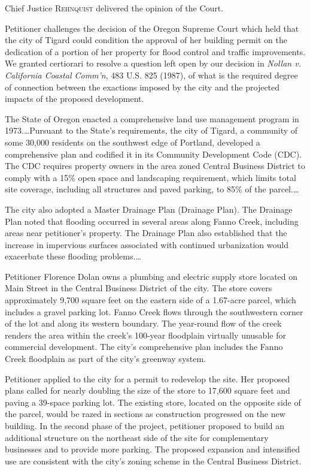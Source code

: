 

\opinion Chief Justice \textsc{Rehnquist} delivered the opinion of the Court.

Petitioner challenges the decision of the Oregon Supreme Court which held that
the city of Tigard could condition the approval of her building permit on the
dedication of a portion of her property for flood control and traffic
improvements. We granted certiorari to resolve a question left open by our
decision in \textit{Nollan v. California Coastal Comm'n}, 483 U.S. 825 (1987),
of what is the required degree of connection between the exactions imposed by
the city and the projected impacts of the proposed development.



The State of Oregon enacted a comprehensive land use management program in
1973.\ldots Pursuant to the State's requirements, the city of Tigard, a
community of some 30,000 residents on the southwest edge of Portland, developed
a comprehensive plan and codified it in its Community Development Code (CDC).
The CDC requires property owners in the area zoned Central Business District to
comply with a 15\% open space and landscaping requirement, which limits total
site coverage, including all structures and paved parking, to 85\% of the
parcel.\ldots

The city also adopted a Master Drainage Plan (Drainage Plan). The Drainage Plan
noted that flooding occurred in several areas along Fanno Creek, including areas
near petitioner's property. The Drainage Plan also established that the increase
in impervious surfaces associated with continued urbanization would exacerbate
these flooding problems.\ldots

Petitioner Florence Dolan owns a plumbing and electric supply store located on
Main Street in the Central Business District of the city. The store covers
approximately 9,700 square feet on the eastern side of a 1.67-acre parcel, which
includes a gravel parking lot. Fanno Creek flows through the southwestern corner
of the lot and along its western boundary. The year-round flow of the creek
renders the area within the creek's 100-year floodplain virtually unusable for
commercial development. The city's comprehensive plan includes the Fanno Creek
floodplain as part of the city's greenway system.

Petitioner applied to the city for a permit to redevelop the site. Her proposed
plans called for nearly doubling the size of the store to 17,600 square feet and
paving a 39-space parking lot. The existing store, located on the opposite side
of the parcel, would be razed in sections as construction progressed on the new
building. In the second phase of the project, petitioner proposed to build an
additional structure on the northeast side of the site for complementary
businesses and to provide more parking. The proposed expansion and intensified
use are consistent with the city's zoning scheme in the Central Business
District.

